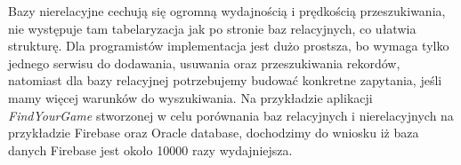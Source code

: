 Bazy nierelacyjne cechują się ogromną wydajnością i prędkością przeszukiwania, nie występuje tam tabelaryzacja jak po stronie baz relacyjnych, co ułatwia strukturę. Dla programistów implementacja jest dużo prostsza, bo wymaga tylko jednego serwisu do dodawania, usuwania oraz przeszukiwania rekordów, natomiast dla bazy relacyjnej potrzebujemy budować konkretne zapytania, jeśli mamy więcej warunków do wyszukiwania. Na przykładzie aplikacji \textit{FindYourGame} stworzonej w celu porównania baz relacyjnych i nierelacyjnych na przykładzie Firebase oraz Oracle database, dochodzimy do wniosku iż baza danych Firebase jest około 10000 razy wydajniejsza.


